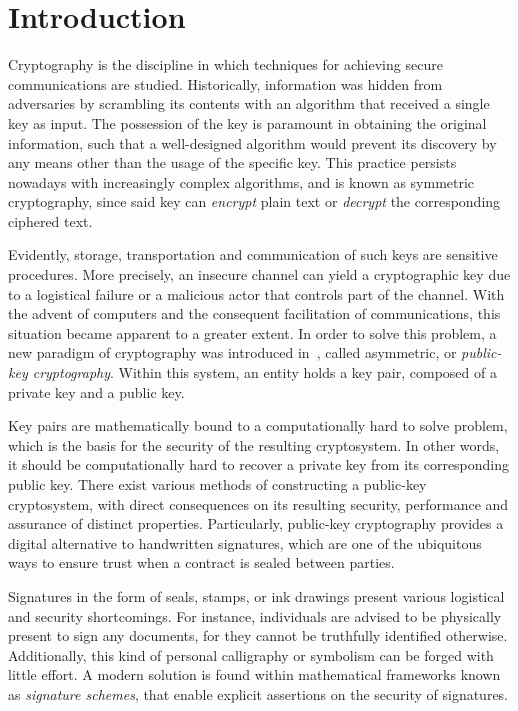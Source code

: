 \documentclass[12pt, a4paper, oneside]{memoir}
\theoremstyle{definition}
\begin{document}
\tableofcontents*

\chapter{Introduction}\label{ch:intro}

Cryptography is the discipline in which techniques for achieving secure communications are studied. Historically, information was hidden from adversaries by scrambling its contents with an algorithm that received a single key as input. The possession of the key is paramount in obtaining the original information, such that a well-designed algorithm would prevent its discovery by any means other than the usage of the specific key. This practice persists nowadays with increasingly complex algorithms, and is known as symmetric cryptography, since said key can \emph{encrypt} plain text or \emph{decrypt} the corresponding ciphered text.

Evidently, storage, transportation and communication of such keys are sensitive procedures. More precisely, an insecure channel can yield a cryptographic key due to a logistical failure or a malicious actor that controls part of the channel. With the advent of computers and the consequent facilitation of communications, this situation became apparent to a greater extent. In order to solve this problem, a new paradigm of cryptography was introduced in~\cite{Diffie:197611}, called asymmetric, or \emph{public-key cryptography}. Within this system, an entity holds a key pair, composed of a private key and a public key. 

Key pairs are mathematically bound to a computationally hard to solve problem, which is the basis for the security of the resulting cryptosystem. In other words, it should be computationally hard to recover a private key from its corresponding public key. There exist various methods of constructing a public-key cryptosystem, with direct consequences on its resulting security, performance and assurance of distinct properties. Particularly, public-key cryptography provides a digital alternative to handwritten signatures, which are one of the ubiquitous ways to ensure trust when a contract is sealed between parties. 

Signatures in the form of seals, stamps, or ink drawings present various logistical and security shortcomings. For instance, individuals are advised to be physically present to sign any documents, for they cannot be truthfully identified otherwise. Additionally, this kind of personal calligraphy or symbolism can be forged with little effort. A modern solution is found within mathematical frameworks known as \emph{signature schemes}, that enable explicit assertions on the security of signatures. 
\end{document}
